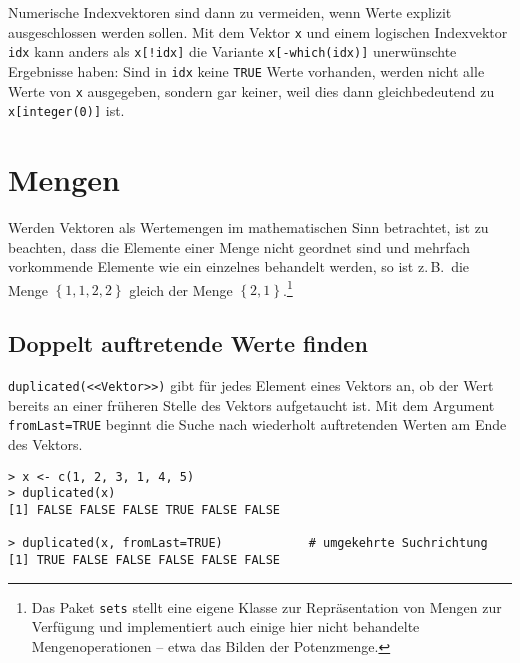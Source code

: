 Numerische Indexvektoren sind dann zu vermeiden, wenn Werte explizit ausgeschlossen werden sollen. Mit dem Vektor \lstinline!x! und einem logischen Indexvektor \lstinline!idx! kann anders als \lstinline|x[!idx]| die Variante \lstinline!x[-which(idx)]! unerwünschte Ergebnisse haben: Sind in \lstinline!idx! keine \lstinline!TRUE! Werte vorhanden, werden nicht alle Werte von \lstinline!x! ausgegeben, sondern gar keiner, weil dies dann gleichbedeutend zu \lstinline!x[integer(0)]! ist.

\section{Mengen}

Werden Vektoren als Wertemengen im mathematischen Sinn betrachtet, ist zu beachten, dass die Elemente einer Menge nicht geordnet sind und mehrfach vorkommende Elemente wie ein einzelnes behandelt werden, so ist z.\,B.\ die Menge $\left\{1, 1, 2, 2\right\}$ gleich der Menge $\left\{2, 1\right\}$.\footnote{Das Paket \lstinline!sets! \cite{Meyer2009a} stellt eine eigene Klasse zur Repräsentation von Mengen zur Verfügung und implementiert auch einige hier nicht behandelte Mengenoperationen -- etwa das Bilden der Potenzmenge.}

\subsection{Doppelt auftretende Werte finden}
\label{sec:unique}

\lstinline!duplicated(<<Vektor>>)! gibt für jedes Element eines Vektors an, ob der Wert bereits an einer früheren Stelle des Vektors aufgetaucht ist. Mit dem Argument \lstinline!fromLast=TRUE! beginnt die Suche nach wiederholt auftretenden Werten am Ende des Vektors.
\begin{lstlisting}
> x <- c(1, 2, 3, 1, 4, 5)
> duplicated(x)
[1] FALSE FALSE FALSE TRUE FALSE FALSE

> duplicated(x, fromLast=TRUE)            # umgekehrte Suchrichtung
[1] TRUE FALSE FALSE FALSE FALSE FALSE
\end{lstlisting}

